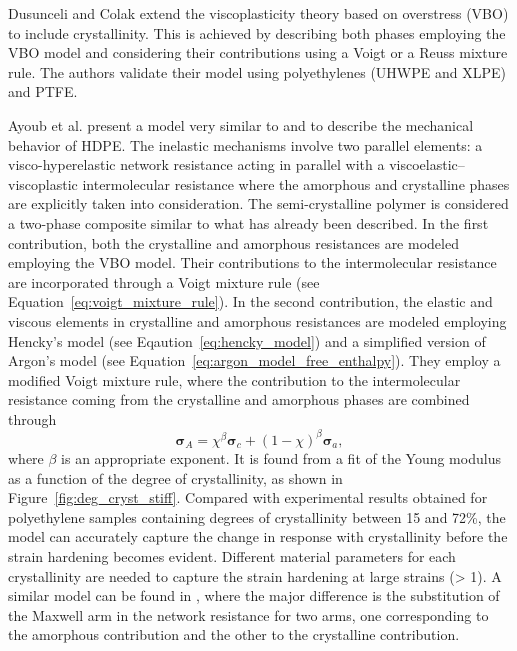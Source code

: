 Dusunceli and Colak \citep{dusunceliModellingEffectsDegree2008} extend the viscoplasticity theory based on overstress (VBO) to include crystallinity.
This is achieved by describing both phases employing the VBO model and considering their contributions using a Voigt or a Reuss mixture rule.
The authors validate their model using polyethylenes (UHWPE and XLPE) and PTFE.

Ayoub et al. \citep{ayoubModellingLargeDeformation2010, ayoubEffectsCrystalContent2011} present a model very similar to \cite{ahziModelingDeformationBehavior2003} and \cite{boyceConstitutiveModelFinite2000} to describe the mechanical behavior of HDPE.
The inelastic mechanisms involve two parallel elements: a visco-hyperelastic network resistance acting in parallel with a viscoelastic–viscoplastic intermolecular resistance where the amorphous and crystalline phases are explicitly taken into consideration.
The semi-crystalline polymer is considered a two-phase composite similar to what has already been described.
In the first contribution, both the crystalline and amorphous resistances are modeled employing the VBO model.
Their contributions to the intermolecular resistance are incorporated through a Voigt mixture rule (see Equation~\eqref{eq:voigt_mixture_rule}).
In the second contribution, the elastic and viscous elements in crystalline and amorphous resistances are modeled employing Hencky's model (see Eqaution~\eqref{eq:hencky_model}) and a simplified version of Argon's model (see Equation~\eqref{eq:argon_model_free_enthalpy}).
They employ a modified Voigt mixture rule, where the contribution to the intermolecular resistance  coming from the crystalline and amorphous phases are combined through
\begin{equation}
  \label{eq:mod_voigt_mixture_rule}
  \bm \sigma_A = \chi^\beta \bm \sigma_c + (1-\chi)^\beta \bm \sigma_a,
\end{equation}
where $\beta$ is an appropriate exponent.
It is found from a fit of the Young modulus as a function of the degree of crystallinity, as shown in Figure~\ref{fig:deg_cryst_stiff}.
Compared with experimental results obtained for polyethylene samples containing degrees of crystallinity between 15 and 72\%, the model can accurately capture the change in response with crystallinity before the strain hardening becomes evident.
Different material parameters for each crystallinity are needed to capture the strain hardening at large strains (> 1).
A similar model can be found in \cite{abdul-hameedTwophaseHyperelasticviscoplasticConstitutive2014}, where the major difference is the substitution of the Maxwell arm in the network resistance for two arms, one corresponding to the amorphous contribution and the other to the crystalline contribution.

